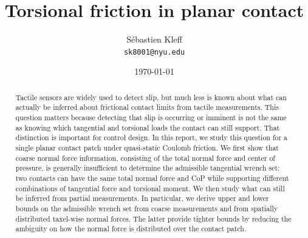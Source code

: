 \documentclass[11pt,a4paper]{article}
\title{\textbf{Torsional friction in planar contact}}
\author{Sébastien Kleff\\[2pt]
\small\texttt{sk8001@nyu.edu}}
\date{\today}
\theoremstyle{plain}
\begin{document}
\maketitle


\begin{abstract}
Tactile sensors are widely used to detect slip, but much less is known about what can actually be inferred about frictional contact limits from tactile measurements. This question matters because detecting that slip is occurring or imminent is not the same as knowing which tangential and torsional loads the contact can still support. That distinction is important for control design. In this report, we study this question for a single planar contact patch under quasi-static Coulomb friction. We first show that coarse normal force information, consisting of the total normal force and center of pressure, is generally insufficient to determine the admissible tangential wrench set: two contacts can have the same total normal force and CoP while supporting different combinations of tangential force and torsional moment. We then study what can still be inferred from partial measurements. In particular, we derive upper and lower bounds on the admissible wrench set from coarse measurements and from spatially distributed taxel-wise normal forces. The latter provide tighter bounds by reducing the ambiguity on how the normal force is distributed over the contact patch.
\end{abstract}
\end{document}
